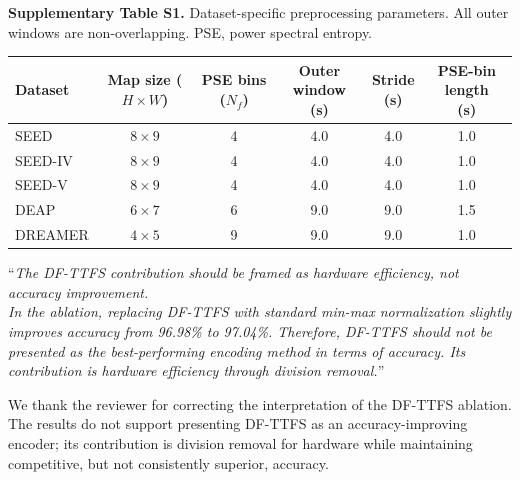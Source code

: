 \documentclass[12pt,technote,onecolumn]{IEEEtran}
\newcommand{\ResponseTableFormat}{%
  \footnotesize
  \renewcommand{\arraystretch}{1.2}%
  \setlength{\tabcolsep}{4pt}%
}
\begin{document}
\noindent\begin{minipage}{\linewidth}
\smallskip\noindent\textbf{Supplementary Table S1.} Dataset-specific preprocessing parameters. All outer windows are non-overlapping. PSE, power spectral entropy.
\begin{center}
\ResponseTableFormat
\begin{tabular*}{\linewidth}{@{\extracolsep{\fill}}lccccc@{}}
\toprule
Dataset & \makecell{Map size\\($H \times W$)} & \makecell{PSE bins\\($N_f$)} & \makecell{Outer window\\(s)} & \makecell{Stride\\(s)} & \makecell{PSE-bin length\\(s)} \\
\midrule
SEED      & $8 \times 9$ & 4 & 4.0 & 4.0 & 1.0 \\
SEED-IV   & $8 \times 9$ & 4 & 4.0 & 4.0 & 1.0 \\
SEED-V    & $8 \times 9$ & 4 & 4.0 & 4.0 & 1.0 \\
DEAP      & $6 \times 7$ & 6 & 9.0 & 9.0 & 1.5 \\
DREAMER   & $4 \times 5$ & 9 & 9.0 & 9.0 & 1.0 \\
\bottomrule
\end{tabular*}
\end{center}
\end{minipage}\par\medskip

\EvidenceSuppTableSFive
\EvidenceSuppTableSSix
\EvidenceSuppTableSSeven

\vspace{4mm}

``{\it The DF-TTFS contribution should be framed as hardware efficiency, not
accuracy improvement.\\
In the ablation, replacing DF-TTFS with standard min-max normalization
slightly improves accuracy from 96.98\% to 97.04\%. Therefore, DF-TTFS
should not be presented as the best-performing encoding method in terms
of accuracy. Its contribution is hardware efficiency through division
removal.}''
\vspace{1mm}


We thank the reviewer for correcting the interpretation of the DF-TTFS ablation. The results do not support presenting DF-TTFS as an accuracy-improving encoder; its contribution is division removal for hardware while maintaining competitive, but not consistently superior, accuracy.
\end{document}
